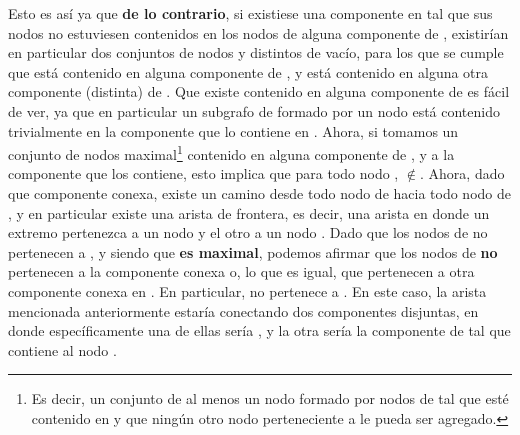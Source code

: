 \documentclass[11pt, a4paper, twoside]{article}
\begin{document}
\begin{paragraph}
\begin{demostracion}
Esto es así ya que \textbf{de lo contrario}, si existiese una componente
 en  tal que sus nodos no estuviesen
contenidos en los nodos de alguna componente de , existirían
en particular dos conjuntos de nodos  y
 distintos de vacío, para los que se
cumple que  está contenido en alguna componente de
, y  está contenido en alguna otra componente
(distinta) de . Que existe  contenido en
alguna componente de  es fácil de ver, ya que en particular un
subgrafo de  formado por un nodo está contenido trivialmente
en la componente que lo contiene en . Ahora, si tomamos
 un conjunto de nodos maximal\footnote{%
Es decir, un conjunto de al menos un nodo formado por nodos de 
tal que esté contenido en  y que ningún otro nodo perteneciente
a  le pueda ser agregado.} 
contenido en alguna componente de , y  a la
componente que los contiene, esto implica que para todo
nodo ,
$\notin$. Ahora, dado que  componente conexa, existe un camino desde todo nodo de
 hacia todo nodo de , y en particular existe
una arista de frontera, es decir, una arista 
en donde un extremo pertenezca a un nodo  y el otro
a un nodo . Dado que los nodos de 
no pertenecen a , y siendo que  \textbf{es
maximal}, podemos afirmar que los nodos de  \textbf{no}
pertenecen a la componente conexa  o, lo que es igual, que
pertenecen a otra componente conexa en . En particular,
 no pertenece a . En este caso, la arista
 mencionada anteriormente estaría conectando dos componentes
disjuntas, en donde específicamente una de ellas sería ,
y la otra sería la componente de  tal que contiene
al nodo .


\end{demostracion}
\end{paragraph}
\end{document}
